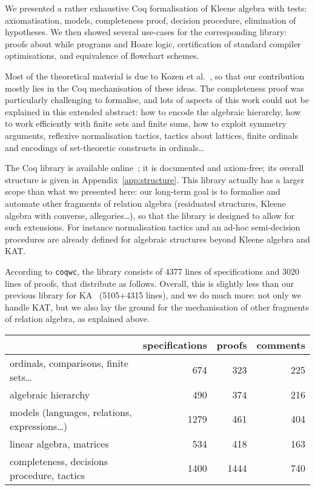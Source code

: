 \documentclass[a4paper]{llncs}
\begin{document}
We presented a rather exhaustive Coq formalisation of Kleene algebra
with tests: axiomatisation, models, completeness proof, decision
procedure, elimination of hypotheses. We then showed several use-cases
for the corresponding library: proofs about while programs and Hoare
logic, certification of standard compiler optimisations, and
equivalence of flowchart schemes.

Most of the theoretical material is due to Kozen et
al.~\cite{kozen94:ka:completeness,kozens96:kat:completeness:decidability,kozen:97:kat,kozen98:ka:typed,kozenp00:kat:compiler:opts,kozen00:kat:hoare,angusk01:kat:schemato,hardink02:kat:hypotheses,kozen08:kat:coalgebra},
so that our contribution mostly lies in the Coq mechanisation of these
ideas.
The completeness proof was particularly challenging to formalise, and
lots of aspects of this work could not be explained in this extended
abstract: how to encode the algebraic hierarchy, how to work
efficiently with finite sets and finite sums, how to exploit symmetry
arguments, reflexive normalisation tactics, tactics about lattices,
finite ordinals and encodings of set-theoretic constructs in
ordinals\dots



The Coq library is available online~\cite{pous:coq:ra}; it is
documented and axiom-free; its overall structure is given in
Appendix~\ref{app:structure}. This library actually has a larger scope
than what we presented here: our long-term goal is to formalise and
automate other fragments of relation algebra (residuated structures,
Kleene algebra with converse, allegories\dots), so that the library is
designed to allow for such extensions. For instance normalisation
tactics and an ad-hoc semi-decision procedures are already defined for
algebraic structures beyond Kleene algebra and KAT.

According to \texttt{coqwc}, the library consists of 4377 lines of
specifications and 3020 lines of proofs, that distribute as follows.
Overall, this is slightly less than our previous library for
KA~\cite{bp:itp10:kacoq} (5105+4315 lines), and we do much more: not
only we handle KAT, but we also lay the ground for the mechanisation
of other fragments of relation algebra, as explained above.

\begin{center}
  \begin{tabular}{|l|r|r|r|}
    \hline
    &specifications&proofs&comments\\
    \hline
    ordinals, comparisons, finite sets\dots&674&323&225\\  
    algebraic hierarchy&490&374&216\\
    models (languages, relations, expressions\dots)&1279&461&404\\
    linear algebra, matrices&534&418&163\\
    completeness, decisions procedure, tactics&1400&1444&740\\
    \hline
  \end{tabular}
\end{center}
\end{document}

